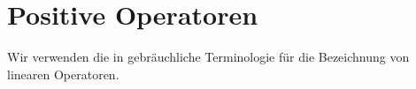 



\section{Positive Operatoren}

\begin{verein}
Wir verwenden die in \cite{engel_nagel_2006} gebräuchliche Terminologie für die Bezeichnung von linearen Operatoren.
\end{verein}






